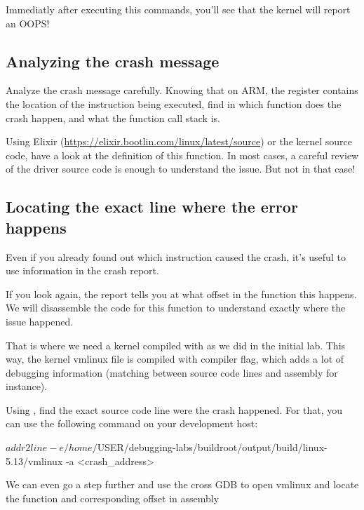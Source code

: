 
Immediatly after executing this commands, you'll see that the kernel will report
an OOPS!

\subsection{Analyzing the crash message}

Analyze the crash message carefully. Knowing that on ARM, the 
register contains the location of the instruction being executed, find
in which function does the crash happen, and what the function call
stack is.

Using Elixir (\url{https://elixir.bootlin.com/linux/latest/source}) or the
kernel source code, have a look at the definition of this function. In most
cases, a careful review of the driver source code is enough to understand the
issue. But not in that case!

\subsection{Locating the exact line where the error happens}

Even if you already found out which instruction caused the crash, it's
useful to use information in the crash report.

If you look again, the report tells you at what offset in the function
this happens. We will disassemble the code for this function to understand
exactly where the issue happened.

That is where we need a kernel compiled with 
as we did in the initial lab. This way, the kernel vmlinux file is
compiled with  compiler flag, which adds a lot of debugging
information (matching between source code lines and assembly for instance).

Using , find the exact source code line were the crash happened.
For that, you can use the following command on your development host:

\begin{bashinput}
$ addr2line -e /home/$USER/debugging-labs/buildroot/output/build/linux-5.13/vmlinux
  -a <crash_address>
\end{bashinput}

We can even go a step further and use the cross GDB to open vmlinux and
locate the function and corresponding offset in assembly

